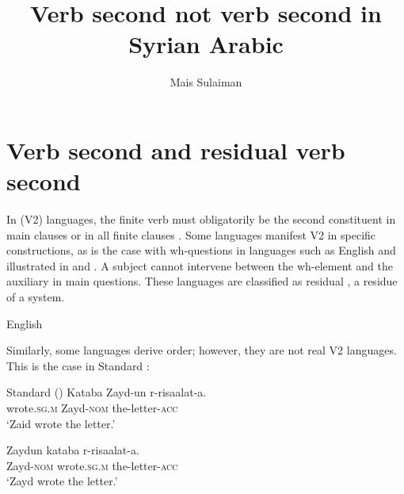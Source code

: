 \documentclass[output=paper]{LSP/langsci}
\author{Mais Sulaiman\affiliation{Newcastle University}
}
\title{Verb second not verb second in Syrian Arabic}
\begin{document}
\section{Verb second and residual verb second}


In  (V2) languages, the finite verb must obligatorily be the second constituent in main clauses or in all finite clauses  \citep{denBesten1977,Rizzi1990speculations,Holmberg2014verbsecond}. Some languages manifest V2 in specific constructions, as is the case with wh-questions in languages such as English and  illustrated in  and . A subject cannot intervene between the wh-element and the auxiliary in main questions. These languages are classified as residual , a residue of a  system.


\ea%
\label{ex:sulaiman:1}
English \citep[63]{Rizzi1996}


\z
\z

\ea%
\label{ex:sulaiman:2}




\z
\z


Similarly, some languages derive  order; however, they are not real V2 languages. This is the case in Standard :


\ea%
\label{ex:sulaiman:3}
Standard   (\citealt[13]{Fassi1993})
\ea \label{ex:sulaiman:3a}
\gll Kataba                                                 Zayd-un        r-risaalat-a. \\
wrote.\textsc{sg.m}         Zayd-\textsc{nom}        the-letter-\textsc{acc}\\
\glt ‘Zaid wrote the letter.’

\ex \label{ex:sulaiman:3b}
\gll Zaydun    kataba r-risaalat-a.\\
Zayd-\textsc{nom}       wrote.\textsc{sg.m}              the-letter-\textsc{acc}\\
\glt ‘Zayd wrote the letter.’
\z
\z
\end{document}
